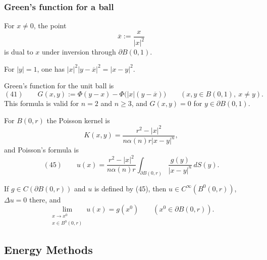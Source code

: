 \subsubsection{Green's function for a ball}
\label{sec:laplace-greens-function-ball}

\begin{definition}
\label{def:dual-point-unit-sphere}




For $x\ne0$, the point
$$\overline x:=\frac{x}{|x|^2}$$
is dual to $x$ under inversion through $\partial B(0,1)$.
\end{definition}

For $|y|=1$, one has $|x|^2|y-\overline x|^2=|x-y|^2$.

\begin{definition}
\label{def:greens-function-ball}




Green's function for the unit ball is
$$(41)\qquad
G(x,y):=\Phi(y-x)-\Phi\bigl(|x|(y-\overline x)\bigr)
\qquad(x,y\in B(0,1),\ x\ne y).$$
This formula is valid for $n=2$ and $n\ge3$, and $G(x,y)=0$ for
$y\in\partial B(0,1)$.
\end{definition}

For $B(0,r)$ the Poisson kernel is
$$K(x,y)=\frac{r^2-|x|^2}{n\alpha(n)r|x-y|^n},$$
and Poisson's formula is
$$(45)\qquad
u(x)=\frac{r^2-|x|^2}{n\alpha(n)r}
\int_{\partial B(0,r)}\frac{g(y)}{|x-y|^n}\,dS(y).$$

\begin{theorem}
\label{thm:poissons-formula-ball}

If $g\in C(\partial B(0,r))$ and $u$ is defined by (45), then
$u\in C^\infty(B^0(0,r))$, $\Delta u=0$ there, and
$$\lim_{\substack{x\to x^0\\x\in B^0(0,r)}}u(x)=g(x^0)
\qquad(x^0\in\partial B(0,r)).$$
\end{theorem}

\subsection{Energy Methods}
\label{sec:laplace-energy-methods}

